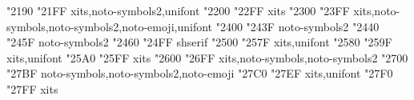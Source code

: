 \documentclass{article}
\begin{document}
                                         {  "2190} {  "21FF} {xits,noto-symbols2,unifont}
                         {  "2200} {  "22FF} {xits}
                        {  "2300} {  "23FF} {xits,noto-symbols,noto-symbols2,noto-emoji,unifont}
                               {  "2400} {  "243F} {noto-symbols2}
                  {  "2440} {  "245F} {noto-symbols2}
                         {  "2460} {  "24FF} {shserif}
                                    {  "2500} {  "257F} {xits,unifont}
                                 {  "2580} {  "259F} {xits,unifont}
                               {  "25A0} {  "25FF} {xits}
                          {  "2600} {  "26FF} {xits,noto-symbols,noto-symbols2}
                                       {  "2700} {  "27BF} {noto-symbols,noto-symbols2,noto-emoji}
           {  "27C0} {  "27EF} {xits,unifont}
                          {  "27F0} {  "27FF} {xits}
\end{document}
